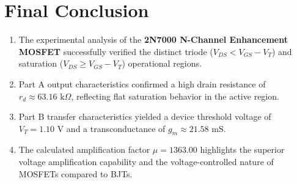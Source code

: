 \documentclass[11pt,a4paper]{article}
\begin{document}
\section{Final Conclusion}
\begin{enumerate}
    \item The experimental analysis of the \textbf{2N7000 N-Channel Enhancement MOSFET} successfully verified the distinct triode ($V_{DS} < V_{GS} - V_T$) and saturation ($V_{DS} \geq V_{GS} - V_T$) operational regions.
    \item Part A output characteristics confirmed a high drain resistance of \textbf{$r_d \approx 63.16\text{ k}\Omega$}, reflecting flat saturation behavior in the active region.
    \item Part B transfer characteristics yielded a device threshold voltage of \textbf{$V_T = 1.10\text{ V}$} and a transconductance of \textbf{$g_m \approx 21.58\text{ mS}$}.
    \item The calculated amplification factor \textbf{$\mu = 1363.00$} highlights the superior voltage amplification capability and the voltage-controlled nature of MOSFETs compared to BJTs.
\end{enumerate}
\end{document}
